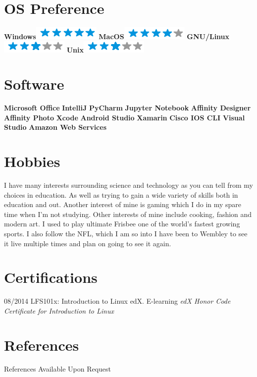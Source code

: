 \documentclass[]{friggeri-cv}
\begin{document}
\begin{aside}
~
~
~
  \section{OS Preference}
    \textbf{Windows}\includegraphics[scale=0.40]{img/5stars.png}
    \textbf{MacOS}\includegraphics[scale=0.40]{img/4stars.png}
    \textbf{GNU/Linux}\includegraphics[scale=0.40]{img/3stars.png}
    \textbf{Unix}\includegraphics[scale=0.40]{img/3stars.png}
    ~
  \section{Software}
\textbf{Microsoft Office}
\textbf{IntelliJ}
\textbf{PyCharm}
\textbf{Jupyter Notebook}
\textbf{Affinity Designer}
\textbf{Affinity Photo}
\textbf{Xcode}
\textbf{Android Studio}
\textbf{Xamarin}
\textbf{Cisco IOS CLI}
\textbf{Visual Studio}
\textbf{Amazon Web Services}
	~
\end{aside}

\section{Hobbies}
I have many interests surrounding science and technology as you can tell from my choices in
education. As well as trying to gain a wide variety of skills both in education and out. Another interest
of mine is gaming which I do in my spare time when I'm not studying. Other interests of mine include
cooking, fashion and modern art. I used to play ultimate Frisbee one of the world's fastest growing
sports. I also follow the NFL, which I am so into I have been to Wembley to see it live multiple times
and plan on going to see it again.
\\
\section{Certifications}
\begin{entrylist}
  \entry
    {08/2014}
    {LFS101x: Introduction to Linux}
    {edX. E-learning}
    {\emph{edX Honor Code Certificate for Introduction to Linux}}
\end{entrylist}

\section{References}
References Available Upon Request
\\
\end{document}
